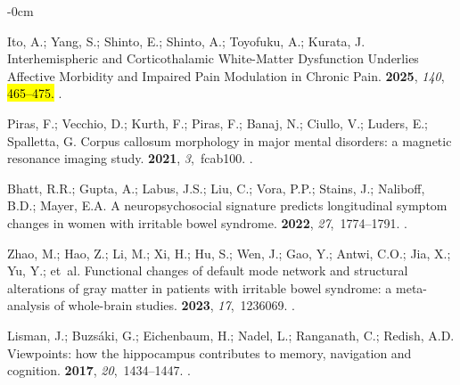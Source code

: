 \documentclass[diagnostics,article,accept,pdftex,moreauthors]{Definitions/mdpi}
\begin{document}
\begin{adjustwidth}{-\extralength}{0cm}
\begin{thebibliography}{999}
Ito, A.; Yang, S.; Shinto, E.; Shinto, A.; Toyofuku, A.; Kurata, J.
\newblock Interhemispheric and Corticothalamic White-Matter Dysfunction
  Underlies Affective Morbidity and Impaired Pain Modulation in Chronic Pain.
 {\bf 2025},  {\em 140}, \hl{465--475.} %
.

Piras, F.; Vecchio, D.; Kurth, F.; Piras, F.; Banaj, N.; Ciullo, V.; Luders,
  E.; Spalletta, G.
\newblock Corpus callosum morphology in major mental disorders: a magnetic
  resonance imaging study.
 {\bf 2021}, {\em 3},~fcab100.
.

Bhatt, R.R.; Gupta, A.; Labus, J.S.; Liu, C.; Vora, P.P.; Stains, J.; Naliboff,
  B.D.; Mayer, E.A.
\newblock A neuropsychosocial signature predicts longitudinal symptom changes
  in women with irritable bowel syndrome.
 {\bf 2022}, {\em 27},~1774--1791.
.

Zhao, M.; Hao, Z.; Li, M.; Xi, H.; Hu, S.; Wen, J.; Gao, Y.; Antwi, C.O.; Jia,
  X.; Yu, Y.;  et~al.
\newblock Functional changes of default mode network and structural alterations
  of gray matter in patients with irritable bowel syndrome: a meta-analysis of
  whole-brain studies.
 {\bf 2023}, {\em 17},~1236069.
.

Lisman, J.; Buzs{\'a}ki, G.; Eichenbaum, H.; Nadel, L.; Ranganath, C.; Redish,
  A.D.
\newblock Viewpoints: how the hippocampus contributes to memory, navigation and
  cognition.
 {\bf 2017}, {\em 20},~1434--1447.
.


\end{thebibliography}
\end{adjustwidth}
\end{document}
